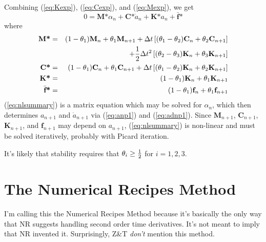 \documentclass[onecolumn,prl,floatfix,12pt]{revtex4}
\newcommand{\M}{\textbf{M}}
\newcommand{\C}{\textbf{C}}
\newcommand{\K}{\textbf{K}}
\newcommand{\f}{\textbf{f}}
\newcommand{\fbarstar}{\textbf{$\bar{\textbf{f}}$*}}
\newcommand{\half}{{1\over2}}
\begin{document}
Combining (\ref{eq:Kexp}), (\ref{eq:Cexp}), and (\ref{eq:Mexp}), we
get
\begin{equation}
  \label{eq:nlsummary}
  0 = \textbf{M*}\alpha_n + \textbf{C*}\dot a_n + \textbf{K*}a_n + \fbarstar
\end{equation}
where
\begin{eqnarray}
  \textbf{M*} &=& 
    (1-\theta_1)\M_n + \theta_1\M_{n+1} 
    + \Delta t\left[(\theta_1-\theta_2)\C_n + \theta_2\C_{n+1}\right]
    \label{eq:Mstar} \\
    && \nonumber\qquad + \half\Delta t^2 \left[
      (\theta_2-\theta_3)\K_n + \theta_3\K_{n+1} \right]\\
    \textbf{C*} &=& (1-\theta_1)\C_n + \theta_1\C_{n+1}
    + \Delta t\left[(\theta_1-\theta_2)\K_n + \theta_2\K_{n+1}\right] 
    \label{eq:Cstar}\\
    \textbf{K*} &=& (1-\theta_1)\K_n + \theta_1\K_{n+1}
    \label{eq:Kstar} \\
    \fbarstar &=& (1-\theta_1)\f_n + \theta_1\f_{n+1} \label{eq:fstar}
\end{eqnarray}
(\ref{eq:nlsummary}) is a matrix equation which may be solved for
$\alpha_n$, which then determines $a_{n+1}$ and $\dot a_{n+1}$ via
(\ref{eq:anp1}) and (\ref{eq:adnp1}).  Since $\M_{n+1}$, $\C_{n+1}$,
$\K_{n+1}$, and $\f_{n+1}$ may depend on $a_{n+1}$,
(\ref{eq:nlsummary}) is non-linear and must be solved iteratively,
probably with Picard iteration.

It's likely that stability requires that $\theta_i\ge\half$ for
$i=1,2,3$.

\section{The Numerical Recipes Method}

I'm calling this the Numerical Recipes Method because it's basically
the only way that NR suggests handling second order time derivatives.
It's not meant to imply that NR invented it.  Surprisingly, Z\&T
\textit{don't} mention this method.
\end{document}
